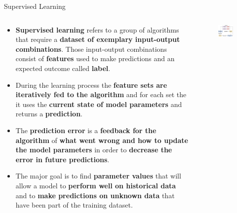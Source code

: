 \documentclass[main.tex]{subfiles}
\begin{document}
    \begin{frame}{Supervised Learning}
        \begin{columns}
            \begin{column}{.6\textwidth}
                \begin{itemize}
                    \item \textbf{Supervised learning} refers to a group of algorithms that require a \textbf{dataset of exemplary input-output combinations}. Those input-output combinations consist of \textbf{features} used to make predictions and an expected outcome called \textbf{label}.
                    \item During the learning process the \textbf{feature sets are iteratively fed to the algorithm} and for each set the it uses the \textbf{current state of model parameters} and returns a \textbf{prediction}.
                    \item The \textbf{prediction error} is a \textbf{feedback for the algorithm} of \textbf{what went wrong and how to update the model parameters} in order to \textbf{decrease the error in future predictions}. 
                    \item The major goal is to find \textbf{parameter values} that will allow a model to \textbf{perform well on historical data} and to \textbf{make predictions on unknown data} that have been part of the training dataset.
                \end{itemize}
            \end{column}
            \begin{column}{.4\textwidth}
                \begin{figure}
                    \label{fig:supervised-learning}
                    \includegraphics[width=\textwidth]{figures/drawio/supervised-learning.png}
                \end{figure}
            \end{column}
        \end{columns}
    \end{frame}
\end{document}
